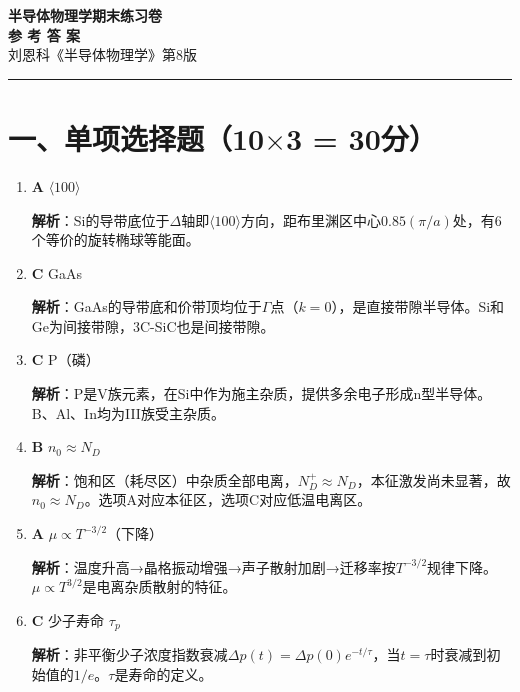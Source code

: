 \documentclass[12pt,a4paper]{ctexart}
\begin{document}
\begin{center}
{\LARGE \textbf{半导体物理学\quad 期末练习卷}}\\[4pt]
{\Large \textbf{参 考 答 案}}\\[6pt]
{\normalsize 刘恩科《半导体物理学》第8版}
\end{center}

\vspace{8pt}
\hrule
\vspace{8pt}

\section*{一、单项选择题（10$\times$3 = 30分）}

\begin{enumerate}[label=\arabic*.,nosep,leftmargin=2em]
\item \textbf{A} $\langle100\rangle$

\textbf{解析}：Si的导带底位于$\Delta$轴即$\langle100\rangle$方向，距布里渊区中心$0.85(\pi/a)$处，有6个等价的旋转椭球等能面。

\item \textbf{C} GaAs

\textbf{解析}：GaAs的导带底和价带顶均位于$\Gamma$点（$k=0$），是直接带隙半导体。Si和Ge为间接带隙，3C-SiC也是间接带隙。

\item \textbf{C} P（磷）

\textbf{解析}：P是V族元素，在Si中作为施主杂质，提供多余电子形成n型半导体。B、Al、In均为III族受主杂质。

\item \textbf{B} $n_0 \approx N_D$

\textbf{解析}：饱和区（耗尽区）中杂质全部电离，$N_D^+ \approx N_D$，本征激发尚未显著，故$n_0 \approx N_D$。选项A对应本征区，选项C对应低温电离区。

\item \textbf{A} $\mu \propto T^{-3/2}$（下降）

\textbf{解析}：温度升高→晶格振动增强→声子散射加剧→迁移率按$T^{-3/2}$规律下降。$\mu \propto T^{3/2}$是电离杂质散射的特征。

\item \textbf{C} 少子寿命 $\tau_p$

\textbf{解析}：非平衡少子浓度指数衰减$\Delta p(t) = \Delta p(0)e^{-t/\tau}$，当$t=\tau$时衰减到初始值的$1/e$。$\tau$是寿命的定义。


\end{enumerate}
\end{document}

